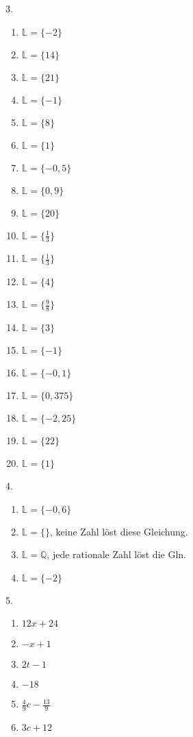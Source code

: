 \documentclass[11pt,a4paper]{scrartcl}
\begin{document}
3.\vspace{-2em} %
\newcommand{\SOLN}[1]{$\mathbb{L} =\{#1\}$}
\begin{multicols}{4}
	\begin{enumerate}[noitemsep,label=\alph*)] 
		\item \SOLN{-2}
		\item \SOLN{14}
		\item \SOLN{21}
		\item \SOLN{-1}
		\item \SOLN{8}
		\item \SOLN{1}
		\item \SOLN{-0,5}
		\item \SOLN{0,9}
		\item \SOLN{20}
		\item \SOLN{\frac13}
		\item \SOLN{\frac13}
		\item \SOLN{4}
		\item \SOLN{\frac98}
		\item \SOLN{3}
		\item \SOLN{-1}
		\item \SOLN{-0,1}
		\item \SOLN{0,375}
		\item \SOLN{-2,25}
		\item \SOLN{22}
		\item \SOLN{1}
	\end{enumerate}
\end{multicols}

	

4.\vspace{-2em}%
\begin{multicols}{2}
	\begin{enumerate}[label=\alph*), noitemsep] 
		\item \SOLN{-0,6}
		\item \SOLN{}, keine Zahl löst diese Gleichung.
		\item $\mathbb{L} = \mathbb{Q}$, jede rationale Zahl löst die Gln.
		\item \SOLN{-2}
	\end{enumerate}
\end{multicols}

5.\vspace{-2em} %
\begin{multicols}{3}
	\begin{enumerate}[label=\alph*), noitemsep] 
		\item $12x+24$ \item $-x+1$ \item $2t-1$
		\item $-18$ \item $\frac{4}{9}c-\frac{13}{9}$ \item $3c+12$
	\end{enumerate}
\end{multicols}
\end{document}

